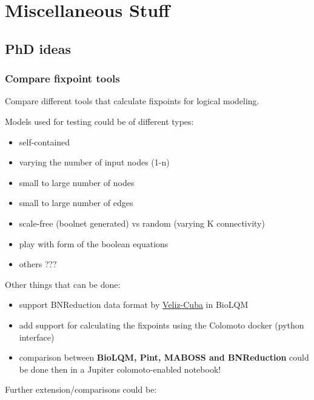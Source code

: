 \documentclass[12pt,]{book}
\providecommand{\tightlist}{%
  \setlength{\itemsep}{0pt}\setlength{\parskip}{0pt}}
\theoremstyle{definition}
\theoremstyle{definition}
\theoremstyle{definition}
\theoremstyle{remark}
\begin{document}
\hypertarget{part-miscellaneous-stuff}{%
\part*{Miscellaneous Stuff}\label{part-miscellaneous-stuff}}

\hypertarget{phd-ideas}{%
\chapter{PhD ideas}\label{phd-ideas}}

\hypertarget{compare-fixpoint-tools}{%
\section{Compare fixpoint tools}\label{compare-fixpoint-tools}}

Compare different tools that calculate fixpoints for logical modeling.

Models used for testing could be of different types:

\begin{itemize}
\tightlist
\item
  self-contained
\item
  varying the number of input nodes (1-n)
\item
  small to large number of nodes
\item
  small to large number of edges
\item
  scale-free (boolnet generated) vs random (varying K connectivity)
\item
  play with form of the boolean equations
\item
  others ???
\end{itemize}

Other things that can be done:

\begin{itemize}
\tightlist
\item
  support BNReduction data format by \href{https://doi.org/10.1186/1471-2105-15-221}{Veliz-Cuba}
  in BioLQM
\item
  add support for calculating the fixpoints using the Colomoto docker (python
  interface)
\item
  comparison between \textbf{BioLQM, Pint, MABOSS and BNReduction} could be done then
  in a Jupiter colomoto-enabled notebook!
\end{itemize}

Further extension/comparisons could be:
\end{document}
